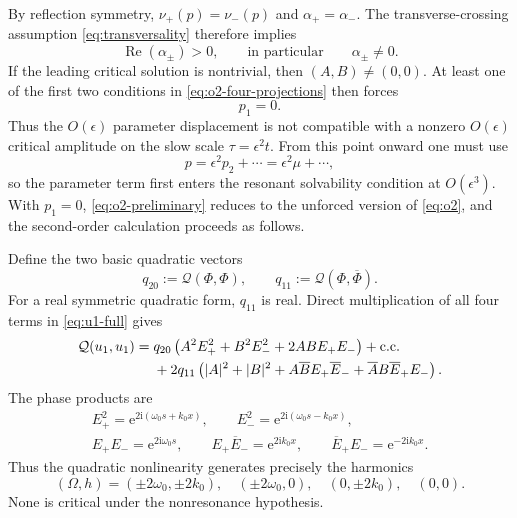 \documentclass[11pt]{article}
\newcommand{\ii}{\mathrm{i}}
\newcommand{\ee}{\mathrm{e}}
\newcommand{\cQ}{\mathcal{Q}}
\newcommand{\cc}{\text{c.c.}}
\DeclareMathOperator{\RePart}{Re}
\begin{document}
By reflection symmetry, $\nu_+(p)=\nu_-(p)$ and
$\alpha_+=\alpha_-$.  The transverse-crossing assumption
\eqref{eq:transversality} therefore implies
\begin{equation}
  \RePart(\alpha_\pm)>0,
  \qquad\text{in particular}\qquad \alpha_\pm\ne0.
\end{equation}
If the leading critical solution is nontrivial, then $(A,B)\ne(0,0)$.
At least one of the first two conditions in \eqref{eq:o2-four-projections}
then forces
\begin{equation}
  \boxed{p_1=0.}
  \label{eq:p1-zero}
\end{equation}
Thus the $O(\epsilon)$ parameter displacement is not compatible with a
nonzero $O(\epsilon)$ critical amplitude on the slow scale
$\tau=\epsilon^2t$.  From this point onward one must use
\begin{equation}
  p=\epsilon^2p_2+\cdots=\epsilon^2\mu+\cdots,
  \label{eq:p-distinguished-after-solvability}
\end{equation}
so the parameter term first enters the resonant solvability condition at
$O(\epsilon^3)$.  With $p_1=0$, \eqref{eq:o2-preliminary} reduces to the
unforced version of \eqref{eq:o2}, and the second-order calculation proceeds
as follows.

Define the two basic quadratic vectors
\begin{equation}
  q_{20}:=\cQ(\Phi,\Phi),
  \qquad
  q_{11}:=\cQ(\Phi,\overline\Phi).
  \label{eq:q20q11}
\end{equation}
For a real symmetric quadratic form, $q_{11}$ is real.  Direct multiplication
of all four terms in \eqref{eq:u1-full} gives
\begin{align}
\cQ(u_1,u_1)={}&q_{20}
  \left(A^2E_+^2+B^2E_-^2+2AB E_+E_-\right)+\cc\notag\\
&+2q_{11}\left(
  |A|^2+|B|^2
  +A\overline B E_+\overline E_-
  +\overline A B\overline E_+E_-
  \right).
\label{eq:Q-u1-expanded}
\end{align}
The phase products are
\begin{equation}
\begin{gathered}
  E_+^2=\ee^{2\ii(\omega_0s+k_0x)},\qquad
  E_-^2=\ee^{2\ii(\omega_0s-k_0x)},\\
  E_+E_-=\ee^{2\ii\omega_0s},\qquad
  E_+\overline E_-=\ee^{2\ii k_0x},\qquad
  \overline E_+E_-=\ee^{-2\ii k_0x}.
\end{gathered}
\label{eq:phase-products}
\end{equation}
Thus the quadratic nonlinearity generates precisely the harmonics
\begin{equation}
  (\Omega,h)=(\pm2\omega_0,\pm2k_0),\quad
  (\pm2\omega_0,0),\quad (0,\pm2k_0),\quad (0,0).
\end{equation}
None is critical under the nonresonance hypothesis.
\end{document}
